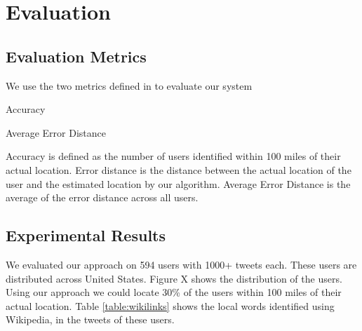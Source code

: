 
\section{Evaluation}
\label{sec:evaluation}

\subsection{Evaluation Metrics}
We use the two metrics defined in \cite{cheng2010you} to evaluate our system \begin{inparaenum}[(1)] \item Accuracy \item Average Error Distance \end{inparaenum}
Accuracy is defined as the number of users identified within 100 miles of their actual location.
Error distance is the distance between the actual location of the user and the estimated location by our algorithm. Average Error Distance is the average of the error distance across all users.

\subsection{Experimental Results}
We evaluated our approach on 594 users with 1000+ tweets each. These users are distributed across United States. Figure X shows the distribution of the users. Using our approach we could locate 30\% of the users within 100 miles of their actual location. Table \ref{table:wikilinks} shows the local words identified using Wikipedia, in the tweets of these users.

